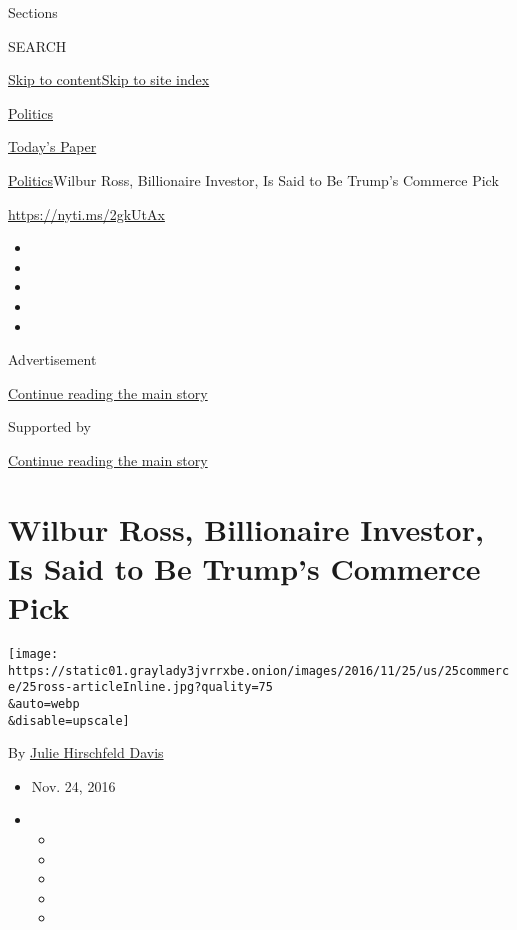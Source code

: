 Sections

SEARCH

\protect\hyperlink{site-content}{Skip to
content}\protect\hyperlink{site-index}{Skip to site index}

\href{https://www.nytimes3xbfgragh.onion/section/politics}{Politics}

\href{https://myaccount.nytimes3xbfgragh.onion/auth/login?response_type=cookie\&client_id=vi}{}

\href{https://www.nytimes3xbfgragh.onion/section/todayspaper}{Today's
Paper}

\href{/section/politics}{Politics}\textbar{}Wilbur Ross, Billionaire
Investor, Is Said to Be Trump's Commerce Pick

\url{https://nyti.ms/2gkUtAx}

\begin{itemize}
\item
\item
\item
\item
\item
\end{itemize}

Advertisement

\protect\hyperlink{after-top}{Continue reading the main story}

Supported by

\protect\hyperlink{after-sponsor}{Continue reading the main story}

\hypertarget{wilbur-ross-billionaire-investor-is-said-to-be-trumps-commerce-pick}{%
\section{Wilbur Ross, Billionaire Investor, Is Said to Be Trump's
Commerce
Pick}\label{wilbur-ross-billionaire-investor-is-said-to-be-trumps-commerce-pick}}

\texttt{[image: https://static01.graylady3jvrrxbe.onion/images/2016/11/25/us/25commerce/25ross-articleInline.jpg?quality=75\\\&auto=webp\\\&disable=upscale]}

By
\href{https://www.nytimes3xbfgragh.onion/by/julie-hirschfeld-davis}{Julie
Hirschfeld Davis}

\begin{itemize}
\item
  Nov. 24, 2016
\item
  \begin{itemize}
  \item
  \item
  \item
  \item
  \item
  \end{itemize}
\end{itemize}

